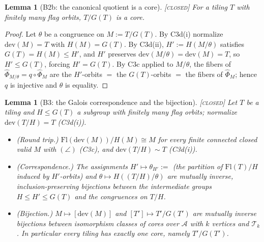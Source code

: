 \documentclass[11pt]{article}
\newtheorem{lemma}[theorem]{Lemma}
\theoremstyle{definition}
\newcommand{\CLOSED}{\textnormal{\textsc{[closed]}}}
\newcommand{\Flags}{\mathrm{Fl}}
\newcommand{\dev}{\mathrm{dev}}
\newcommand{\A}{\mathcal{A}}
\newcommand{\T}{\mathcal{T}}
\begin{document}
\begin{lemma}[B2b: the canonical quotient is a core]\label{lem:B2b} \CLOSED\;
For a tiling $T$ with finitely many flag orbits, $T/G(T)$ is a core.
\end{lemma}

\begin{proof}
Let $\theta$ be a congruence on $M := T/G(T)$. By C3d(i) normalize
$\dev(M) = T$ with $H(M) = G(T)$. By C3d(ii), $H' := H(M/\theta)$ satisfies
$G(T) = H(M) \le H'$, and $H'$ preserves $\dev(M/\theta) = \dev(M) = T$, so
$H' \le G(T)$, forcing $H' = G(T)$. By C3c applied to $M/\theta$, the fibers of
$\hat\Phi_{M/\theta} = q \circ \hat\Phi_M$ are the $H'$-orbits $=$ the $G(T)$-orbits
$=$ the fibers of $\hat\Phi_M$; hence $q$ is injective and $\theta$ is equality.
\end{proof}

\begin{lemma}[B3: the Galois correspondence and the bijection]\label{lem:B3} \CLOSED\;
Let $T$ be a tiling and $H \le G(T)$ a subgroup with finitely many flag orbits;
normalize $\dev(T/H) = T$ (C3d(i)).
\begin{itemize}
\item[(a)] (Round trip.) $\Flags(\dev(M))/H(M) \cong M$ for every finite connected
  closed valid $M$ with $(\angle)$ (C3c), and $\dev(T/H) \sim T$ (C3d(i)).
\item[(b)] (Correspondence.) The assignments
  $H' \mapsto \theta_{H'} :=$ (the partition of $\Flags(T)/H$ induced by $H'$-orbits)
  and $\theta \mapsto H\!\left((T/H)/\theta\right)$ are mutually inverse,
  inclusion-preserving bijections between the intermediate groups
  $H \le H' \le G(T)$ and the congruences on $T/H$.
\item[(c)] (Bijection.) $M \mapsto [\dev(M)]$ and $[T'] \mapsto T'/G(T')$ are mutually
  inverse bijections between isomorphism classes of cores over $\A$ with $k$ vertices
  and $\T_k$. In particular every tiling has exactly one core, namely $T'/G(T')$.
\end{itemize}
\end{lemma}
\end{document}
